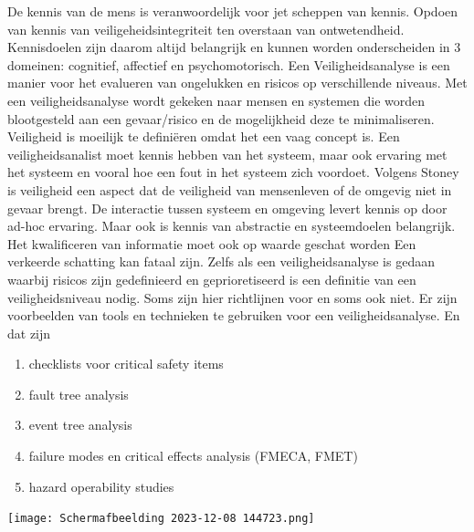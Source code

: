 \documentclass{article}
\begin{document}
	De kennis van de mens is veranwoordelijk voor jet scheppen van kennis. Opdoen van kennis van veiligeheidsintegriteit ten overstaan van ontwetendheid. Kennisdoelen zijn daarom altijd belangrijk en kunnen worden onderscheiden in 3 domeinen: cognitief, affectief en psychomotorisch.\cite{winceckCriticalToSafety}
	Een Veiligheidsanalyse is een manier voor het evalueren  van ongelukken en risicos op verschillende niveaus. Met een veiligheidsanalyse wordt gekeken naar mensen en systemen die worden blootgesteld aan een gevaar/risico en de mogelijkheid deze te minimaliseren.
	Veiligheid is moeilijk te definiëren omdat het een vaag concept is.
	Een veiligheidsanalist  moet kennis hebben van het systeem, maar ook ervaring met het systeem en vooral hoe een fout in het systeem zich voordoet.
	Volgens Stoney\cite{chambersHazardAnalysisSCS} is veiligheid een aspect dat de veiligheid van mensenleven  of de omgevig niet in gevaar brengt.
	De interactie tussen systeem en omgeving levert kennis op door ad-hoc ervaring. Maar ook is kennis van abstractie en systeemdoelen belangrijk.
	Het kwalificeren van informatie moet ook op waarde geschat worden Een verkeerde schatting kan fataal zijn. Zelfs als een veiligheidsanalyse  is gedaan waarbij risicos zijn gedefinieerd en geprioretiseerd is een definitie van een veiligheidsniveau nodig. Soms zijn hier richtlijnen voor en soms ook niet.
	Er zijn voorbeelden van tools en technieken te gebruiken voor een veiligheidsanalyse. En dat zijn 
	\begin{enumerate}
		\item   checklists voor critical safety items
		\item  fault tree analysis
		\item  event tree analysis
		\item failure modes en critical effects analysis (FMECA, FMET)
		\item hazard operability studies
	\end{enumerate}
	
	\cite{rslater1998SCSAnalysis}
	
	\texttt{[image: Schermafbeelding 2023-12-08 144723.png]}
	
\end{document}

